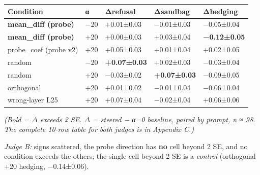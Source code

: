 \documentclass[
]{article}
\newcounter{none} %
\begin{document}
{\def\LTcaptype{none} %
\begin{longtable}[]{@{}
  >{\raggedright\arraybackslash}p{}
  >{\raggedright\arraybackslash}p{}
  >{\raggedleft\arraybackslash}p{}
  >{\raggedleft\arraybackslash}p{}
  >{\raggedleft\arraybackslash}p{}@{}}
\toprule\noalign{}
\begin{minipage}[b]{\linewidth}\raggedright
Condition
\end{minipage} & \begin{minipage}[b]{\linewidth}\raggedright
α
\end{minipage} & \begin{minipage}[b]{\linewidth}\raggedleft
Δrefusal
\end{minipage} & \begin{minipage}[b]{\linewidth}\raggedleft
Δsandbag
\end{minipage} & \begin{minipage}[b]{\linewidth}\raggedleft
Δhedging
\end{minipage} \\
\midrule\noalign{}
\endhead
\bottomrule\noalign{}
\endlastfoot
\textbf{mean\_diff (probe)} & −20 & +0.01±0.03 & −0.01±0.03 &
−0.05±0.04 \\
\textbf{mean\_diff (probe)} & +20 & +0.00±0.03 & +0.03±0.04 &
\textbf{−0.12±0.05} \\
probe\_coef (probe v2) & +20 & +0.05±0.03 & +0.01±0.04 & +0.02±0.05 \\
random & −20 & \textbf{+0.07±0.03} & +0.02±0.03 & −0.03±0.04 \\
random & +20 & −0.03±0.02 & \textbf{+0.07±0.03} & −0.09±0.05 \\
orthogonal & +20 & +0.01±0.02 & −0.01±0.04 & −0.06±0.04 \\
wrong-layer L25 & +20 & +0.07±0.04 & −0.02±0.04 & +0.06±0.06 \\
\end{longtable}
}

\emph{(Bold = \textbar Δ\textbar{} exceeds 2 SE. Δ = steered − α=0
baseline, paired by prompt, n ≈ 98. The complete 10-row table for both
judges is in Appendix C.)}

\emph{Judge B:} signs scattered, the probe direction has \textbf{no}
cell beyond 2 SE, and no condition exceeds the others; the single cell
beyond 2 SE is a \emph{control} (orthogonal +20 hedging, −0.14±0.06).
\end{document}

